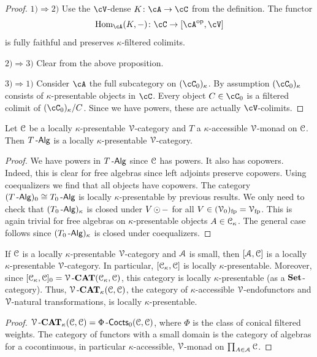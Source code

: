 \documentclass[a4paper,11pt,oneside,openany]{scrbook}
\begin{document}
\begin{proof}
	\item[$ 1)\Rightarrow 2) $]
	Use the $ \cV $-dense $ K \from \cA \to \cC $ from the definition.
	The functor
	\begin{displaymath}
		\Hom_{\cA}(K,-)\from \cC \to [\cA^{\op},\cV]
	\end{displaymath}
	is fully faithful and preserves $ \kappa $-filtered colimits.
	\item[$ 2) \Rightarrow 3) $]
	Clear from the above proposition.
	\item[$ 3) \Rightarrow 1) $]
	Consider $ \cA $ the full subcategory on $ (\cC_0)_\kappa $.
	By assumption $ (\cC_0)_\kappa $ consists of $ \kappa $-presentable objects in $ \cC $.
	Every object $ C \in\cC_0 $ is a filtered colimit of $ (\cC_0)_\kappa / C $.
	Since we have powers, these are actually $ \cV $-colimits.
\end{proof}
\begin{cor}
	Let $\operatorname{\mathcal{C}}$ be a locally $\kappa$-presentable $\operatorname{\mathcal{V}}$-category and $T$ a $\kappa$-accessible $\operatorname{\mathcal{V}}$-monad on $\operatorname{\mathcal{C}}$. Then $T\operatorname{-\mathsf{Alg}}$ is a locally $\kappa$-presentable $\operatorname{\mathcal{V}}$-category.
\end{cor}
\begin{proof}
	We have powers in $T\operatorname{-\mathsf{Alg}}$ since $\operatorname{\mathcal{C}}$ has powers. It also has copowers. Indeed, this is clear for free algebras since left adjoints preserve copowers. Using coequalizers we find that all objects have copowers. The category $(T\operatorname{-\mathsf{Alg}})_0\cong T_0\operatorname{-\mathsf{Alg}}$ is locally $\kappa$-presentable by previous results. We only need to check that $(T_0\operatorname{-\mathsf{Alg}})_{\kappa}$ is closed under $V\operatorname{\odot}-$ for all $V\in(\operatorname{\mathcal{V}}_0)_{\text{fp}}=\operatorname{\mathcal{V}}_{\text{fp}}$. This is again trivial for free algebras on $\kappa$-presentable objects $A\in\operatorname{\mathcal{C}}_\kappa$. The general case follows since $(T_0\operatorname{-\mathsf{Alg}})_\kappa$ is closed under coequalizers.
\end{proof}
\begin{cor}
	If $\operatorname{\mathcal{C}}$ is a locally $\kappa$-presentable $\operatorname{\mathcal{V}}$-category and $\operatorname{\mathcal{A}}$ is small, then $[\operatorname{\mathcal{A}},\operatorname{\mathcal{C}}]$ is a locally $\kappa$-presentable $\operatorname{\mathcal{V}}$-category. In particular, $[\operatorname{\mathcal{C}}_\kappa, \operatorname{\mathcal{C}}]$ is locally $\kappa$-presentable. Moreover, since  $[\operatorname{\mathcal{C}}_\kappa, \operatorname{\mathcal{C}}]_0 = \operatorname{\mathcal{V}}\mbox{-}{\normalfont\textbf{CAT}}(\operatorname{\mathcal{C}}_\kappa,\operatorname{\mathcal{C}})$, this category is locally $\kappa$-presentable (as a ${\normalfont\textbf{Set}}$-category). Thus, $\operatorname{\mathcal{V}}\mbox{-}{\normalfont\textbf{CAT}}_\kappa(\operatorname{\mathcal{C}},\operatorname{\mathcal{C}})$, the category of $\kappa$-accessible $\operatorname{\mathcal{V}}$-endofunctors and $\operatorname{\mathcal{V}}$-natural transformations, is locally $\kappa$-presentable.
\end{cor}
\begin{proof}
	$\operatorname{\mathcal{V}}\mbox{-}{\normalfont\textbf{CAT}}_\kappa(\operatorname{\mathcal{C}},\operatorname{\mathcal{C}})=\Phi\operatorname{-\mathsf{Cocts}}_0(\operatorname{\mathcal{C}},\operatorname{\mathcal{C}})$, where $\Phi$ is the class of conical filtered weights. The category of functors with a small domain is the category of algebras for a cocontinuous, in particular $\kappa$-accessible, $\operatorname{\mathcal{V}}$-monad on $\prod_{A\in\operatorname{\mathcal{A}}}\operatorname{\mathcal{C}}$.
\end{proof}
\end{document}
